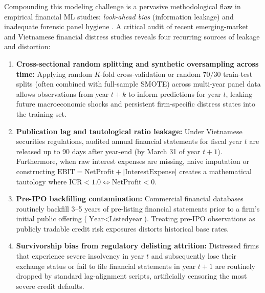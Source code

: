 \documentclass[11pt,a4paper]{article}
\begin{document}
Compounding this modeling challenge is a pervasive methodological flaw in empirical financial ML studies: \textit{look-ahead bias} (information leakage) and inadequate forensic panel hygiene \citep{bailey2014pseudo,lopez2018advances}. A critical audit of recent emerging-market and Vietnamese financial distress studies \citep[e.g.,][]{pham2018financial,vo2019corporate,tran2022explainable,tran2023examining,vu2023lasso} reveals four recurring sources of leakage and distortion:
\begin{enumerate}
    \item \textbf{Cross-sectional random splitting and synthetic oversampling across time:} Applying random $K$-fold cross-validation or random $70/30$ train-test splits (often combined with full-sample SMOTE) across multi-year panel data allows observations from year $t+k$ to inform predictions for year $t$, leaking future macroeconomic shocks and persistent firm-specific distress states into the training set.
    \item \textbf{Publication lag and tautological ratio leakage:} Under Vietnamese securities regulations, audited annual financial statements for fiscal year $t$ are released up to 90 days after year-end (by March 31 of year $t+1$). Furthermore, when raw interest expenses are missing, naive imputation or constructing $\text{EBIT} = \text{NetProfit} + |\text{InterestExpense}|$ creates a mathematical tautology where $\text{ICR} < 1.0 \iff \text{NetProfit} < 0$.
    \item \textbf{Pre-IPO backfilling contamination:} Commercial financial databases routinely backfill 3--5 years of pre-listing financial statements prior to a firm's initial public offering ($\text{Year} < \text{Listedyear}$). Treating pre-IPO observations as publicly tradable credit risk exposures distorts historical base rates.
    \item \textbf{Survivorship bias from regulatory delisting attrition:} Distressed firms that experience severe insolvency in year $t$ and subsequently lose their exchange status or fail to file financial statements in year $t+1$ are routinely dropped by standard lag-alignment scripts, artificially censoring the most severe credit defaults.
\end{enumerate}
\end{document}
